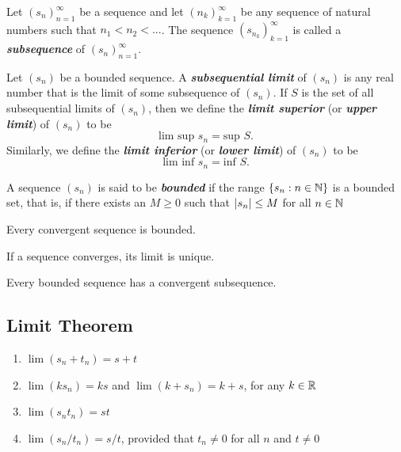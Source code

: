 \documentclass[12pt]{article}
\begin{document}
\begin{definition}[Subsequence]
Let $(s_n)_{n=1}^\infty$ be a sequence and let $(n_k)_{k=1}^{\infty}$ be any sequence
of natural numbers such that $n_1 < n_2 < ...$. The sequence
$(s_{n_k})_{k=1}^{\infty}$ is called a \textit{\textbf{subsequence}} of
$(s_n)_{n=1}^\infty$.
\end{definition}

\begin{definition}
  Let $(s_n)$ be a bounded sequence. A \textbf{\textit{subsequential limit}}
  of $(s_n)$ is any real number that is the limit of some subsequence of
  $(s_n)$. If $S$ is the set of all subsequential limits of $(s_n)$, then we
  define the \textbf{\textit{limit superior}} (or \textbf{\textit{upper
  limit}}) of $(s_n)$ to be $$\text{lim sup } s_n = \text{sup } S.$$
  Similarly, we define the \textit{\textbf{limit inferior}} (or
  \textit{\textbf{lower limit}}) of $(s_n)$ to be $$\text{lim inf } s_n =
  \text{inf } S.$$
\end{definition}

\begin{definition}
  A sequence $(s_n)$ is said to be \textit{\textbf{bounded}} if the range $\{
  s_n : n \in \mathbb{N} \}$ is a bounded set, that is, if there exists an $M \ge
  0$ such that $\left|s_n\right| \le M$ for all $n \in \mathbb{N}$

  Every convergent sequence is bounded.

  If a sequence converges, its limit is unique.

  Every bounded sequence has a convergent subsequence.
\end{definition}

\subsection{Limit Theorem}
\label{sec:orgb063131}
\begin{definition}
  \begin{enumerate}
    \item $\lim{(s_n + t_n)} = s + t$
    \item $\lim{(ks_n)} = ks$ and $\lim{(k + s_n)} = k + s$, for any $k \in
      \mathbb{R}$
    \item $\lim{(s_n t_n)} = st$
    \item $\lim{(s_n/t_n)} = s/t$, provided that $t_n \ne 0$ for all $n$ and $t
      \ne 0$
  \end{enumerate}
\end{definition}
\end{document}
